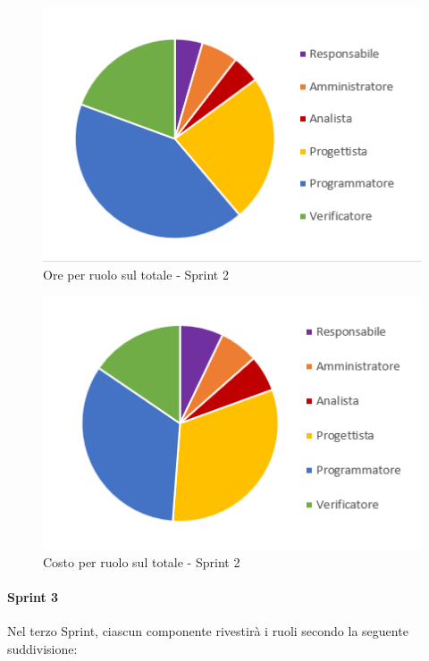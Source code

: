 \begin{figure}[H]
  \centering
  \includegraphics[scale=0.8]{immagini/2Sprint_oreRuolo.png}
  \caption{Ore per ruolo sul totale - Sprint 2}
\end{figure}

\begin{figure}[H]
  \centering
  \includegraphics[scale=0.8]{immagini/2Sprint_costoRuolo.png}
  \caption{Costo per ruolo sul totale - Sprint 2}
\end{figure}
\pagebreak

\paragraph{Sprint 3} \label{paragraph:preventivo_sprint3}
Nel terzo Sprint\glo{}, ciascun componente rivestirà i ruoli secondo la seguente suddivisione:

